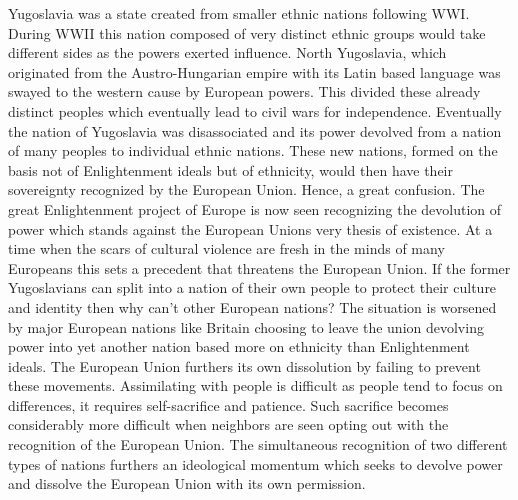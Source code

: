 \documentclass[a4paper, 12pt]{article}
\begin{document}
Yugoslavia was a state created from smaller ethnic nations following WWI. During WWII this nation composed of very distinct ethnic groups would take different sides as the powers exerted influence. North Yugoslavia, which originated from the Austro-Hungarian empire with its Latin based language was swayed to the western cause by European powers. This divided these already distinct peoples which eventually lead to civil wars for independence. Eventually the nation of Yugoslavia was disassociated and its power devolved from a nation of many peoples to individual ethnic nations. These new nations, formed on the basis not of Enlightenment ideals but of ethnicity, would then have their sovereignty recognized by the European Union. Hence, a great confusion. The great Enlightenment project of Europe is now seen recognizing the devolution of power which stands against the European Unions very thesis of existence. At a time when the scars of cultural violence are fresh in the minds of many Europeans this sets a precedent that threatens the European Union. If the former Yugoslavians can split into a nation of their own people to protect their culture and identity then why can't other European nations? The situation is worsened by major European nations like Britain choosing to leave the union devolving power into yet another nation based more on ethnicity than Enlightenment ideals. The European Union furthers its own dissolution by failing to prevent these movements. Assimilating with people is difficult as people tend to focus on differences, it requires self-sacrifice and patience. Such sacrifice becomes considerably more difficult when neighbors are seen opting out with the recognition of the European Union. The simultaneous recognition of two different types of nations furthers an ideological momentum which seeks to devolve power and dissolve the European Union with its own permission.
\end{document}
